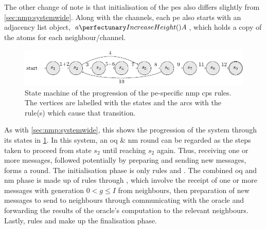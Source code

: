 The other change of note is that initialisation of the \glspl{pe} also differs slightly from \cref{sec:nmp:systemwide}.  Along with the channels, each \gls{pe} also starts with an adjacency list object, \(\cpfunc{a}{A}\), which holds a copy of the atoms for each neighbour/channel.

\begin{figure}
    \centering
    \includegraphics[width=1.0\textwidth]{chapters/nmp/images/proxelspecificstatemachine.pdf}
    \caption[State machine of the progression of the -specific  \gls{cps} rules]{State machine of the progression of the \gls{pe}-specific \gls{nmp} \gls{cps} rules.  The vertices are labelled with the states and the arcs with the rule(s) which cause that transition.}
    \label{fig:nmp:proxelspecificstatemachine}
\end{figure}

As with \cref{sec:nmp:systemwide}, this  shows the progression of the system through its states in \cref{fig:nmp:proxelspecificstatemachine}.  In this system, an \gls{oq} \& \gls{nm} round can be regarded as the steps taken to proceed from state \(s_2\) until reaching \(s_2\) again.  Thus, receiving one or more messages, followed potentially by preparing and sending new messages, forms a round.  The initialisation phase is only rules  and .  The combined \gls{oq} and \gls{nm} phase is made up of rules  through , which involve the receipt of one or more messages with generation \(0 < g \leq I\) from neighbours, then preparation of new messages to send to neighbours through communicating with the oracle and forwarding the results of the oracle's computation to the relevant neighbours.  Lastly, rules  and  make up the finalisation phase.

